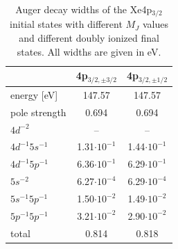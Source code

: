 \begin{table}[h]
 \centering
 \caption{Auger decay widths of the Xe4p$_{3/2}$ initial states with
          different $M_J$ values and different doubly ionized final
          states.
          All widths are given in \unit{eV}.}
 \begin{tabular}{lcc}
   \toprule
                      & 4p$_{3/2,\pm 3/2}$ & 4p$_{3/2,\pm 1/2}$  \\
   \midrule                                                      
   energy [\unit{eV}] &   147.57           &    147.57          \\
   pole strength       &     0.694          &      0.694         \\
   \midrule                                                     
   $4d^{-2}$          &      --            &        --            \\
   $4d^{-1}5s^{-1}$   & 1.31$\cdot10^{-1}$ & 1.44$\cdot10^{-1}$ \\
   $4d^{-1}5p^{-1}$   & 6.36$\cdot10^{-1}$ & 6.29$\cdot10^{-1}$ \\
   $5s^{-2}$          & 6.27$\cdot10^{-4}$ & 6.29$\cdot10^{-4}$ \\
   $5s^{-1}5p^{-1}$   & 1.50$\cdot10^{-2}$ & 1.49$\cdot10^{-2}$ \\
   $5p^{-1}5p^{-1}$   & 3.21$\cdot10^{-2}$ & 2.90$\cdot10^{-2}$ \\
   \midrule
   total              &   0.814            &   0.818            \\
   \bottomrule
 \end{tabular}
 \label{table:xe_auger_rest}
\end{table}


